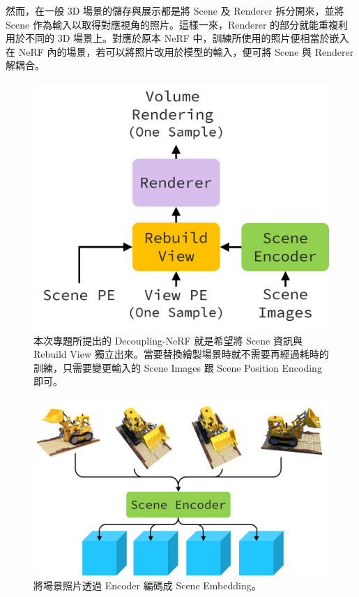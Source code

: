 \documentclass[10pt,twocolumn,letterpaper]{article}
\begin{document}
\begin{CJK}{UTF8}{bkai}
   然而，在一般 3D 場景的儲存與展示都是將 Scene 及 Renderer 拆分開來，並將 Scene
   作為輸入以取得對應視角的照片。這樣一來，Renderer 的部分就能重複利用於不同的
   3D 場景上。對應於原本 NeRF 中，訓練所使用的照片便相當於嵌入在 NeRF
   內的場景，若可以將照片改用於模型的輸入，便可將 Scene 與 Renderer 解耦合。
   \begin{figure}[t]
      \begin{center}
         \includegraphics[width=0.9\linewidth]{img/Decoupling-NeRF.png}
      \end{center}
      \caption{
         本次專題所提出的 Decoupling-NeRF 就是希望將 Scene
         資訊與 Rebuild View 獨立出來。當要替換繪製場景時就不需要再經過耗時的訓練，只需要變更輸入的
         Scene Images 跟 Scene Position Encoding 即可。
      }
      \label{fig:Decoupling-NeRF}
   \end{figure}

   \begin{figure}[t]
      \begin{center}
         \includegraphics[width=1\linewidth]{img/encode-scene.png}
      \end{center}
      \caption{
         將場景照片透過 Encoder 編碼成 Scene Embedding。
      }
      \label{fig:encode-scene}
   \end{figure}


\end{CJK}
\end{document}
